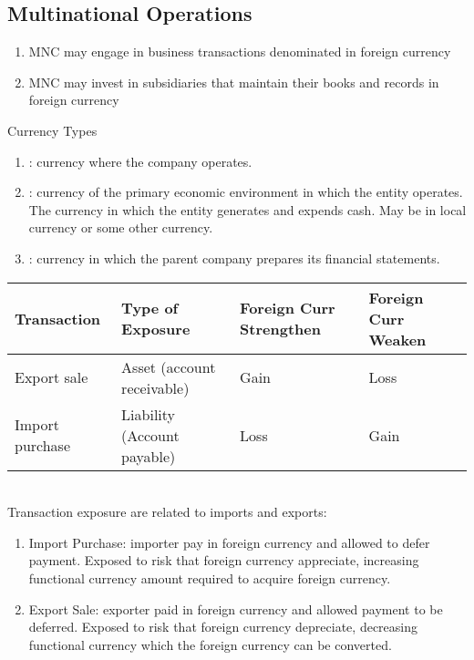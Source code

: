 \subsection{Multinational Operations}

\begin{remark} 
\begin{enumerate}[label=\roman*.]
\setlength{\itemsep}{0pt}
\item MNC may engage in business transactions denominated in foreign currency
\item MNC may invest in subsidiaries that maintain their books and records in foreign currency
\end{enumerate}
\end{remark}

\begin{definition} Currency Types
\begin{enumerate}[label=\roman*.]
\setlength{\itemsep}{0pt}
\item {}: currency where the company operates.
\item {}: currency of the primary economic environment in which the entity operates. The currency in which the entity generates and expends cash. May be in local currency or some other currency.
\item {}: currency in which the parent company prepares its financial statements.
\end{enumerate}
\end{definition}

\begin{flushleft}
\begin{tabularx}{\textwidth}{p{8em}|X|p{11em}|p{11em}}
\hline
\rowcolor{gray!30}
Transaction & Type of Exposure & Foreign Curr Strengthen & Foreign Curr Weaken \\
\hline
Export sale & Asset (account receivable) & Gain & Loss \\
\hline
Import purchase & Liability (Account payable) & Loss & Gain \\
\hline
\end{tabularx}
\end{flushleft}

\begin{remark}  \\
Transaction exposure are related to imports and exports:
\begin{enumerate}[label=\roman*.]
\setlength{\itemsep}{0pt}
\item Import Purchase: importer pay in foreign currency and allowed to defer payment. Exposed to risk that foreign currency appreciate, increasing functional currency amount required to acquire foreign currency.
\item Export Sale: exporter paid in foreign currency and allowed payment to be deferred. Exposed to risk that foreign currency depreciate, decreasing functional currency which the foreign currency can be converted.
\end{enumerate}
\end{remark}

